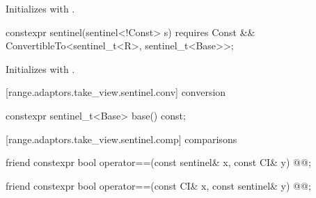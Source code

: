 \begin{itemdescr}
\pnum
\effects Initializes  with .
\end{itemdescr}

%
\begin{itemdecl}
constexpr sentinel(sentinel<!Const> s)
  requires Const && ConvertibleTo<sentinel_t<R>, sentinel_t<Base>>;
\end{itemdecl}

\begin{itemdescr}
\pnum
\effects Initializes  with .
\end{itemdescr}

[range.adaptors.take_view.sentinel.conv]{ conversion}

\begin{itemdecl}
constexpr sentinel_t<Base> base() const;
\end{itemdecl}

\begin{itemdescr}
\pnum
\oldtxt{\returns}  
\end{itemdescr}

[range.adaptors.take_view.sentinel.comp]{ comparisons}

\begin{itemdecl}
friend constexpr bool operator==(const sentinel& x, const CI& y)
  @@;
\end{itemdecl}

\begin{itemdescr}
\pnum
\oldtxt{\returns} 
\end{itemdescr}

\begin{itemdecl}
friend constexpr bool operator==(const CI& x, const sentinel& y)
  @@;
\end{itemdecl}

\begin{itemdescr}
\pnum
\oldtxt{\returns} 
\end{itemdescr}

